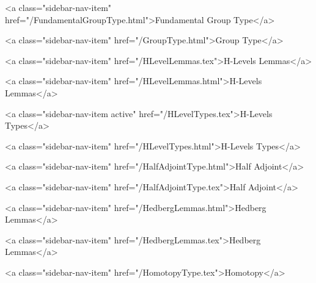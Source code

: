       
    
      
        
          <a class="sidebar-nav-item" href="/FundamentalGroupType.html">Fundamental Group Type</a>
        
      
    
      
        
          <a class="sidebar-nav-item" href="/GroupType.html">Group Type</a>
        
      
    
      
        
          <a class="sidebar-nav-item" href="/HLevelLemmas.tex">H-Levels Lemmas</a>
        
      
    
      
        
          <a class="sidebar-nav-item" href="/HLevelLemmas.html">H-Levels Lemmas</a>
        
      
    
      
        
          <a class="sidebar-nav-item active" href="/HLevelTypes.tex">H-Levels Types</a>
        
      
    
      
        
          <a class="sidebar-nav-item" href="/HLevelTypes.html">H-Levels Types</a>
        
      
    
      
        
          <a class="sidebar-nav-item" href="/HalfAdjointType.html">Half Adjoint</a>
        
      
    
      
        
          <a class="sidebar-nav-item" href="/HalfAdjointType.tex">Half Adjoint</a>
        
      
    
      
        
          <a class="sidebar-nav-item" href="/HedbergLemmas.html">Hedberg Lemmas</a>
        
      
    
      
        
          <a class="sidebar-nav-item" href="/HedbergLemmas.tex">Hedberg Lemmas</a>
        
      
    
      
        
          <a class="sidebar-nav-item" href="/HomotopyType.tex">Homotopy</a>
        
